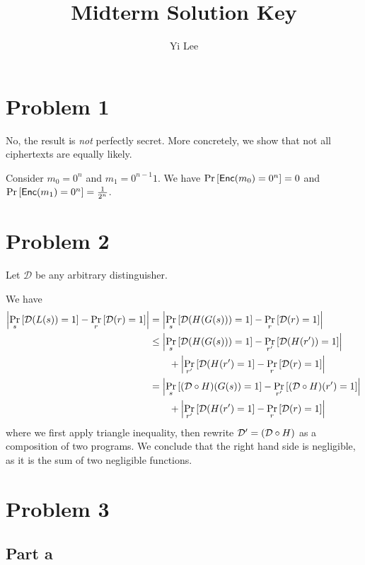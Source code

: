 \documentclass{article}
\title{Midterm Solution Key}
\author{Yi Lee}
\theoremstyle{definition}
\begin{document}


\maketitle

\section*{Problem 1}

No, the result is \emph{not} perfectly secret.
More concretely, we show that not all ciphertexts are equally likely.

Consider $m_0=0^n$ and $m_1=0^{n-1}1$.
We have
$\Pr\left[\mathsf{Enc}(m_0)=0^n\right]=0$
and
$\Pr\left[\mathsf{Enc}(m_1)=0^n\right]=\frac{1}{2^n}$.

\section*{Problem 2}

Let $\mathcal{D}$ be any arbitrary distinguisher.

We have
\begin{align*}
    \abs{\Pr_s\left[\mathcal{D}(L(s))=1\right]-\Pr_r\left[\mathcal{D}(r)=1\right]} &= \abs{\Pr_s\left[\mathcal{D}(H(G(s)))=1\right]-\Pr_r\left[\mathcal{D}(r)=1\right]} \\
    &\leq \abs{\Pr_s\left[\mathcal{D}(H(G(s)))=1\right]-\Pr_{r'}\left[\mathcal{D}(H(r'))=1\right]} \\
    &\qquad + \abs{\Pr_{r'}\left[\mathcal{D}(H(r')=1\right]-\Pr_r\left[\mathcal{D}(r)=1\right]} \\
    &= \abs{\Pr_s\left[(\mathcal{D}\circ H)(G(s))=1\right]-\Pr_{r'}\left[(\mathcal{D}\circ H)(r')=1\right]} \\
    &\qquad + \abs{\Pr_{r'}\left[\mathcal{D}(H(r')=1\right]-\Pr_r\left[\mathcal{D}(r)=1\right]}
\end{align*}
where we first apply triangle inequality,
then rewrite $\mathcal{D}'=(\mathcal{D}\circ H)$ as a composition of two programs.
We conclude that the right hand side is negligible, as it is the sum of two negligible functions.

\section*{Problem 3}

\subsection*{Part a}
\end{document}
